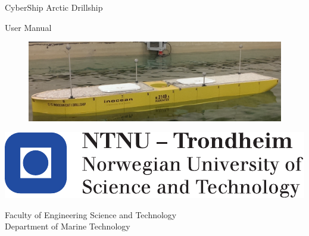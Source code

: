 \documentclass[12pt]{report}
\begin{document}
\thispagestyle{empty}

\vspace*{3cm}

\begin{center}
	{\LARGE{}CyberShip Arctic Drillship}
	\par\end{center}{\LARGE \par}

\begin{center}
	{\LARGE{}User Manual }
	\par\end{center}{\LARGE \par}

\begin{figure}[h!]
	\centering
	\includegraphics[width=\linewidth]{fig/CSAD_photo.png}
\end{figure}

\begin{flushleft}
	\vfill{}
	\par\end{flushleft}

\begin{flushleft}
	\includegraphics[scale=0.6]{fig/NTNU_logo.pdf}
	\par\end{flushleft}
Faculty of Engineering Science and Technology\\
Department of Marine Technology

\clearpage{}

\setcounter{page}{0}

\tableofcontents
\setcounter{page}{0}



\appendix


  
\end{document}
